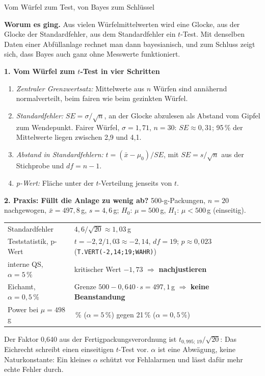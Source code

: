 \begin{handout}{Vom Würfel zum Test, von Bayes zum Schlüssel}

\textbf{Worum es ging.} Aus vielen Würfelmittelwerten wird eine Glocke,
aus der Glocke der Standardfehler, aus dem Standardfehler ein $t$-Test.
Mit denselben Daten einer Abfüllanlage rechnet man dann bayesianisch, und
zum Schluss zeigt sich, dass Bayes auch ganz ohne Messwerte funktioniert.

\textbf{1. Vom Würfel zum $t$-Test in vier Schritten}
\begin{enumerate}\itemsep 0pt
  \item \emph{Zentraler Grenzwertsatz:} Mittelwerte aus $n$ Würfen sind
    annähernd normalverteilt, beim fairen wie beim gezinkten Würfel.
  \item \emph{Standardfehler:} $\mathit{SE}=\sigma/\sqrt{n}$, an der Glocke
    abzulesen als Abstand vom Gipfel zum Wendepunkt. Fairer Würfel,
    $\sigma=1{,}71$, $n=30$: $\mathit{SE}\approx0{,}31$; 95\,\% der
    Mittelwerte liegen zwischen 2,9 und 4,1.
  \item \emph{Abstand in Standardfehlern:} $t=(\bar{x}-\mu_0)/\mathit{SE}$,
    mit $\mathit{SE}=s/\sqrt{n}$ aus der Stichprobe und $\mathit{df}=n-1$.
  \item \emph{p-Wert:} Fläche unter der $t$-Verteilung jenseits von $t$.
\end{enumerate}

\textbf{2. Praxis: Füllt die Anlage zu wenig ab?} 500-g-Packungen, $n=20$
nachgewogen, $\bar{x}=497{,}8$\,g, $s=4{,}6$\,g; $H_0$: $\mu=500$\,g,
$H_1$: $\mu<500$\,g (einseitig).
\begin{center}
\small
\begin{tabular}{@{}>{\raggedright\arraybackslash}p{}>{\raggedright\arraybackslash}p{}@{}}
\toprule
Standardfehler & $4{,}6/\sqrt{20}\approx1{,}03$\,g \\
Teststatistik, p-Wert & $t=-2{,}2/1{,}03\approx-2{,}14$, $\mathit{df}=19$; $p\approx0{,}023$ (\texttt{T.VERT(-2,14;19;WAHR)}) \\
interne QS, $\alpha=5\,\%$ & kritischer Wert $-1{,}73$ $\Rightarrow$ \textbf{nachjustieren} \\
Eichamt, $\alpha=0{,}5\,\%$ & Grenze $500-0{,}640\cdot s=497{,}1$\,g $\Rightarrow$ \textbf{keine Beanstandung} \\
Power bei $\mu=498$\,g & 59\,\% ($\alpha=5\,\%$) gegen 21\,\% ($\alpha=0{,}5\,\%$) \\
\bottomrule
\end{tabular}
\end{center}
Der Faktor 0,640 aus der Fertigpackungsverordnung ist
$t_{0{,}995;\,19}/\sqrt{20}$: Das Eichrecht schreibt einen einseitigen
$t$-Test vor. $\alpha$ ist eine Abwägung, keine Naturkonstante: Ein
kleines $\alpha$ schützt vor Fehlalarmen und lässt dafür mehr echte
Fehler durch.


\end{handout}
